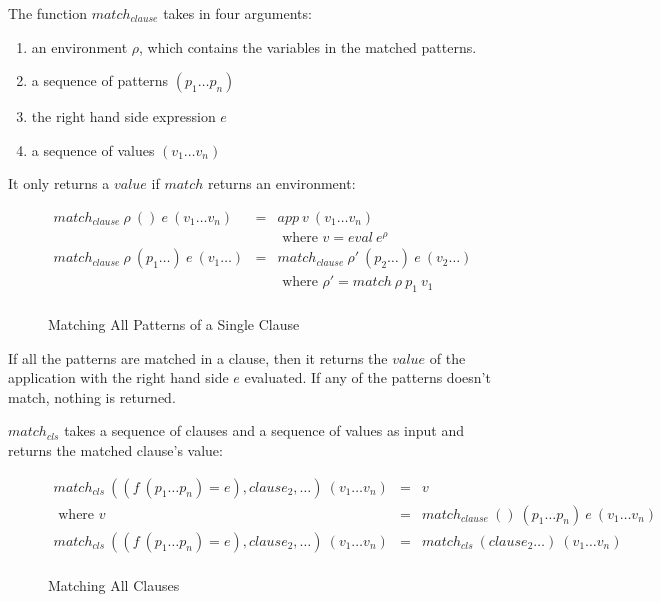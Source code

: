 \documentclass[acmsmall]{acmart}
\begin{document}
The function $match_{clause}$ takes in four arguments:

\begin{enumerate}
  \item an environment $\rho$, which contains the variables in the matched patterns.
  \item a sequence of patterns $(p_1 \dots p_n)$
  \item the right hand side expression $e$
  \item a sequence of values $(v_1 \dots v_n)$
\end{enumerate}

It only returns a $value$ if $match$ returns an environment:

\begin{figure}[H]
  \begin{equation*}
    \begin{aligned}
      match_{clause} \: \rho \: () \: e \: (v_1 \dots v_n)      & = & app \: v \: (v_1 \dots v_n)                                \\
                                                                &   & \textrm{ where } v = eval \: e^{\rho}                      \\
      match_{clause} \: \rho \: (p_1 \dots) \: e \: (v_1 \dots) & = & match_{clause} \: \rho' \: (p_2 \dots) \: e \: (v_2 \dots) \\
                                                                &   & \textrm{ where } \rho' = match \: \rho \: p_1 \: v_1       \\                                                        
    \end{aligned}
  \end{equation*}
  \caption{Matching All Patterns of a Single Clause}
\end{figure}

If all the patterns are matched in a clause, then it returns the $value$ of the application with the right hand side $e$ evaluated. If any of the patterns doesn't match, nothing is returned.

$match_{cls}$ takes a sequence of clauses and a sequence of values as input and returns the matched clause's value:

\begin{figure}[H]
  \begin{equation*}
    \begin{aligned}
      match_{cls} \: ((f \: (p_1 \dots p_n) = e), clause_2, \dots) \: (v_1 \dots v_n) & = & v                                                               \\
      \textrm{ where } v                                                              & = & match_{clause} \: () \: (p_1 \dots p_n) \: e \: (v_1 \dots v_n) \\
      match_{cls} \: ((f \: (p_1 \dots p_n) = e), clause_2, \dots) \: (v_1 \dots v_n) & = & match_{cls} \: (clause_2 \dots) \: (v_1 \dots v_n)              \\
    \end{aligned}
  \end{equation*}
  \caption{Matching All Clauses}
\end{figure}
\end{document}
